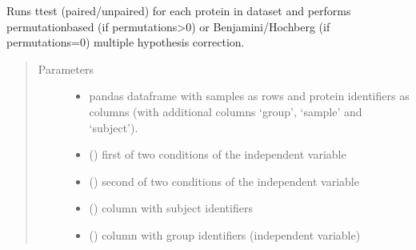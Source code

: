 \documentclass[letterpaper,10pt,english]{sphinxmanual}
\begin{document}
\begin{fulllineitems}
\label{\detokenize{_autosummary/analytics_core.analytics:analytics_core.analytics.analytics.run_ttest}}
Runs t\sphinxhyphen{}test (paired/unpaired) for each protein in dataset and performs permutation\sphinxhyphen{}based (if permutations\textgreater{}0) or Benjamini/Hochberg (if permutations=0) multiple hypothesis correction.
\begin{quote}\begin{description}
\item[{Parameters}] \leavevmode\begin{itemize}
\item {} 
 \textendash{} pandas dataframe with samples as rows and protein identifiers as columns (with additional columns ‘group’, ‘sample’ and ‘subject’).

\item {} 
 () \textendash{} first of two conditions of the independent variable

\item {} 
 () \textendash{} second of two conditions of the independent variable

\item {} 
 () \textendash{} column with subject identifiers

\item {} 
 () \textendash{} column with group identifiers (independent variable)


\end{itemize}
\end{description}
\end{quote}
\end{fulllineitems}
\end{document}
